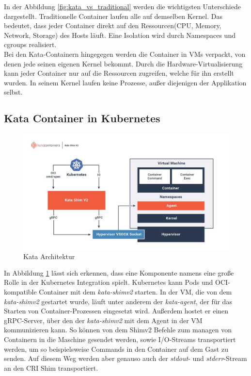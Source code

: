 In der Abbildung \ref{fig:kata_vs_traditional} werden die wichtigsten Unterschiede dargestellt.
Traditionelle Container laufen alle auf demselben Kernel. 
Das bedeutet, dass jeder Container direkt auf den Ressourcen(CPU, Memory, Network, Storage) des Hosts läuft. 
Eine Isolation wird durch Namespaces und cgroups realisiert.
\\
Bei den Kata-Containern hingegegen werden die Container in \ac{VM}s verpackt, von denen jede seinen eigenen Kernel bekommt.
Durch die Hardware-Virtualisierung kann jeder Container nur auf die Ressourcen zugreifen, welche für ihn erstellt wurden. 
In seinem Kernel laufen keine Prozesse, außer diejenigen der Applikation selbst.  

\subsection{Kata Container in Kubernetes}

\begin{figure}[ht]
        \centering
        \includegraphics[width=\textwidth]{bilder/katacontainers_architecture_diagram.jpg}
        \caption{Kata Architektur\cite{kata_learn}}
        \label{fig:kata_architecture}
\end{figure}

In Abbildung \ref{fig:kata_architecture} lässt sich erkennen, dass eine Komponente namens  eine große Rolle in der Kubernetes Integration spielt.
Kubernetes kann Pods und \ac{OCI}-kompatible Container mit dem \textit{kata-shimv2} starten. 
In der \ac{VM}, die von dem \textit{kata-shimv2} gestartet wurde, läuft unter anderem der \textit{kata-agent}, der für das Starten von Container-Prozessen eingesetzt wird.
Außerdem hostet er einen \ac{gRPC}-Server, über den der \textit{kata-shimv2} mit dem Agent in der \ac{VM} kommunizieren kann.
So können von dem Shimv2 Befehle zum managen von Containern in die Maschine gesendet werden, sowie \ac{I/O}-Streams transportiert werden, um so beispielsweise Commands in den Container auf dem Gast zu senden.
Auf diesem Weg werden aber genauso auch der \textit{stdout}- und \textit{stderr}-Stream an den \ac{CRI} Shim transportiert.
\cite{kata_architecture}

